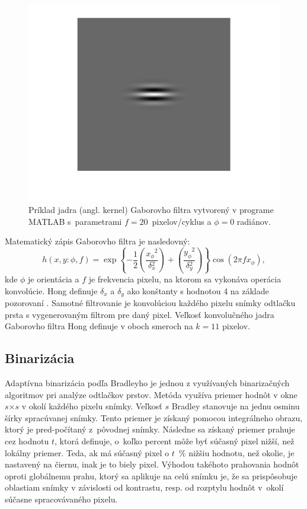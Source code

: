  \begin{figure}[h]
    \centering
    \includegraphics[width=0.25\linewidth]{obrazky-figures/gabor_kernel.png}
    \caption{Príklad jadra (angl. kernel) Gaborovho filtra vytvorený v programe MATLAB s~parametrami {$f = 20$}~pixelov/cyklus a $\phi{} = 0$ radiánov.}
    \label{obr:gabor_kernel}
  \end{figure}
  Matematický zápis Gaborovho filtra je nasledovný:
  \begin{equation}
    h(x,y: \phi{}, f) = \exp{\left\{ -\frac{1}{2} \left( \frac{x_\phi{}^2}{\delta{}_x^2} \right) + \left( \frac{y_\phi{}^2}{\delta{}_y^2} \right) \right\}} \cos{}\left(2\pi{}fx_\phi{}\right),
  \end{equation}
  kde $\phi{}$ je orientácia a $f$ je frekvencia pixelu, na ktorom sa vykonáva operácia konvolúcie. Hong definuje $\delta{}_x$ a $\delta{}_y$
  ako konštanty s hodnotou 4 na základe pozorovaní \cite{Hong}. Samotné filtrovanie je konvolúciou každého pixelu snímky odtlačku prsta s vygenerovaným filtrom
  pre daný pixel. Veľkosť konvolučného jadra Gaborovho filtra Hong definuje v oboch smeroch na $k = 11$ pixelov.

  \subsection{Binarizácia} \label{sec:binarizacia}
  Adaptívna binarizácia podľa Bradleyho \cite{bradley2007adaptive} je jednou z využívaných binarizačných algoritmov pri analýze odtlačkov prstov.
  Metóda využíva priemer hodnôt v okne $s$$\times{}$$s$ v okolí každého pixelu snímky. Veľkosť $s$ Bradley stanovuje na jednu osminu šírky spracúvanej snímky.
  Tento priemer je získaný pomocou integrálneho obrazu, ktorý je pred-počítaný
  z~pôvodnej snímky. Následne sa získaný priemer prahuje cez hodnotu $t$, ktorá definuje, o~koľko percent môže byť súčasný pixel nižší, než lokálny priemer.
  Teda, ak má súčasný pixel o {$t$}~\% nižšiu hodnotu, než okolie, je nastavený na čiernu, inak je to biely pixel. Výhodou takéhoto prahovania hodnôt oproti
  globálnemu prahu, ktorý sa aplikuje na celú snímku je, že sa prispôsobuje oblastiam snímky v závislosti od kontrastu, resp. od rozptylu hodnôt v~okolí
  súčasne spracovávaného pixelu.

